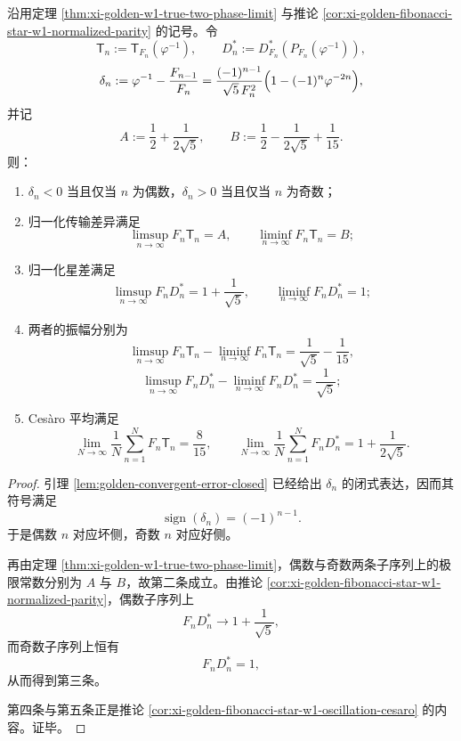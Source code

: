 \begin{theorem}\label{thm:xi-golden-fibonacci-w1-star-strict-parity-law}
沿用定理 \ref{thm:xi-golden-w1-true-two-phase-limit} 与推论 \ref{cor:xi-golden-fibonacci-star-w1-normalized-parity} 的记号。令
\[
\mathsf T_n:=\mathsf T_{F_n}(\varphi^{-1}),
\qquad
D_n^\ast:=D_{F_n}^\ast(P_{F_n}(\varphi^{-1})),
\]
\[
\delta_n:=\varphi^{-1}-\frac{F_{n-1}}{F_n}
=
\frac{(-1)^{n-1}}{\sqrt5\,F_n^2}\Bigl(1-(-1)^n\varphi^{-2n}\Bigr),
\]
并记
\[
A:=\frac12+\frac{1}{2\sqrt5},
\qquad
B:=\frac12-\frac{1}{2\sqrt5}+\frac1{15}.
\]
则：
\begin{enumerate}
  \item \(\delta_n<0\) 当且仅当 \(n\) 为偶数，\(\delta_n>0\) 当且仅当 \(n\) 为奇数；
  \item 归一化传输差异满足
  \[
  \limsup_{n\to\infty}F_n\mathsf T_n=A,
  \qquad
  \liminf_{n\to\infty}F_n\mathsf T_n=B;
  \]
  \item 归一化星差满足
  \[
  \limsup_{n\to\infty}F_nD_n^\ast=1+\frac1{\sqrt5},
  \qquad
  \liminf_{n\to\infty}F_nD_n^\ast=1;
  \]
  \item 两者的振幅分别为
  \[
  \limsup_{n\to\infty}F_n\mathsf T_n-\liminf_{n\to\infty}F_n\mathsf T_n
  =
  \frac1{\sqrt5}-\frac1{15},
  \]
  \[
  \limsup_{n\to\infty}F_nD_n^\ast-\liminf_{n\to\infty}F_nD_n^\ast
  =
  \frac1{\sqrt5};
  \]
  \item Ces\`aro 平均满足
  \[
  \lim_{N\to\infty}\frac1N\sum_{n=1}^N F_n\mathsf T_n
  =
  \frac{8}{15},
  \qquad
  \lim_{N\to\infty}\frac1N\sum_{n=1}^N F_nD_n^\ast
  =
  1+\frac{1}{2\sqrt5}.
  \]
\end{enumerate}
\end{theorem}
\begin{proof}
引理 \ref{lem:golden-convergent-error-closed} 已经给出 \(\delta_n\) 的闭式表达，因而其符号满足
\[
\operatorname{sign}(\delta_n)=(-1)^{n-1}.
\]
于是偶数 \(n\) 对应坏侧，奇数 \(n\) 对应好侧。

再由定理 \ref{thm:xi-golden-w1-true-two-phase-limit}，偶数与奇数两条子序列上的极限常数分别为 \(A\) 与 \(B\)，故第二条成立。由推论 \ref{cor:xi-golden-fibonacci-star-w1-normalized-parity}，偶数子序列上
\[
F_nD_n^\ast\to 1+\frac1{\sqrt5},
\]
而奇数子序列上恒有
\[
F_nD_n^\ast=1,
\]
从而得到第三条。

第四条与第五条正是推论 \ref{cor:xi-golden-fibonacci-star-w1-oscillation-cesaro} 的内容。证毕。
\end{proof}

